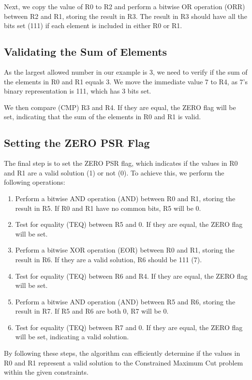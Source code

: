 Next, we copy the value of R0 to R2 and perform a bitwise OR operation (ORR) between R2 and R1, storing the result in R3. The result in R3 should have all the bits set (111) if each element is included in either R0 or R1.

\subsection{Validating the Sum of Elements}
As the largest allowed number in our example is 3, we need to verify if the sum of the elements in R0 and R1 equals 3. We move the immediate value 7 to R4, as 7's binary representation is 111, which has 3 bits set.

We then compare (CMP) R3 and R4. If they are equal, the ZERO flag will be set, indicating that the sum of the elements in R0 and R1 is valid.

\subsection{Setting the ZERO PSR Flag}
The final step is to set the ZERO PSR flag, which indicates if the values in R0 and R1 are a valid solution (1) or not (0). To achieve this, we perform the following operations:

\begin{enumerate}
    \item Perform a bitwise AND operation (AND) between R0 and R1, storing the result in R5. If R0 and R1 have no common bits, R5 will be 0.
    \item Test for equality (TEQ) between R5 and 0. If they are equal, the ZERO flag will be set.
    \item Perform a bitwise XOR operation (EOR) between R0 and R1, storing the result in R6. If they are a valid solution, R6 should be 111 (7).
    \item Test for equality (TEQ) between R6 and R4. If they are equal, the ZERO flag will be set.
    \item Perform a bitwise AND operation (AND) between R5 and R6, storing the result in R7. If R5 and R6 are both 0, R7 will be 0.
    \item Test for equality (TEQ) between R7 and 0. If they are equal, the ZERO flag will be set, indicating a valid solution.
\end{enumerate}

By following these steps, the algorithm can efficiently determine if the values in R0 and R1 represent a valid solution to the Constrained Maximum Cut problem within the given constraints.



